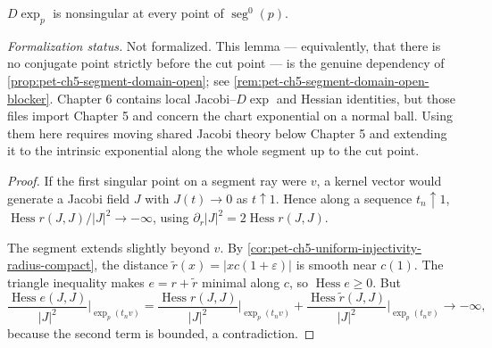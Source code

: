\begin{lemma}
  \label{lem:pet-ch5-exp-nonsingular-segment-domain}
  \notready
  \notready
  $D\exp_p$ is nonsingular at every point of $\operatorname{seg}^0(p)$.

  \emph{Formalization status.} Not formalized. This lemma — equivalently, that
  there is no conjugate point strictly before the cut point — is the genuine
  dependency of \cref{prop:pet-ch5-segment-domain-open}; see
  \cref{rem:pet-ch5-segment-domain-open-blocker}. Chapter 6 contains local
  Jacobi--$D\exp$ and Hessian identities, but those files import Chapter 5 and
  concern the chart exponential on a normal ball. Using them here requires
  moving shared Jacobi theory below Chapter 5 and extending it to the intrinsic
  exponential along the whole segment up to the cut point.
\end{lemma}
\begin{proof}
  \sketch
  If the first singular point on a segment ray were $v$, a kernel vector would
  generate a Jacobi field $J$ with $J(t)\to0$ as $t\uparrow1$.  Hence along a
  sequence $t_n\uparrow1$,
  $\operatorname{Hess}r(J,J)/|J|^2\to-\infty$, using
  $\partial_r|J|^2=2\operatorname{Hess}r(J,J)$.

  The segment extends slightly beyond $v$.  By
  \cref{cor:pet-ch5-uniform-injectivity-radius-compact}, the distance
  $\tilde r(x)=|xc(1+\varepsilon)|$ is smooth near $c(1)$.  The triangle inequality
  makes $e=r+\tilde r$ minimal along $c$, so $\operatorname{Hess}e\ge0$.  But
  \[
    \frac{\operatorname{Hess}e(J,J)}{|J|^2}\Big|_{\exp_p(t_nv)}
    =\frac{\operatorname{Hess}r(J,J)}{|J|^2}\Big|_{\exp_p(t_nv)}
    +\frac{\operatorname{Hess}\tilde r(J,J)}{|J|^2}\Big|_{\exp_p(t_nv)}\to-\infty,
  \]
  because the second term is bounded, a contradiction.
\end{proof}

